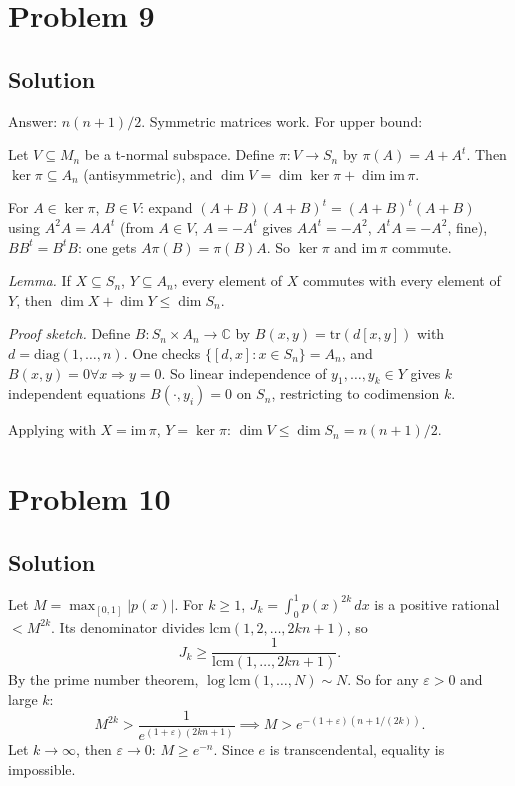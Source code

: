 \documentclass{article}
\begin{document}
\section*{Problem 9}
\subsection*{Solution}
Answer: $n(n+1)/2$. Symmetric matrices work. For upper bound:

Let $V \subseteq M_n$ be a t-normal subspace. Define $\pi: V \to S_n$ by $\pi(A) = A + A^t$. Then $\ker \pi \subseteq A_n$ (antisymmetric), and $\dim V = \dim\ker\pi + \dim\mathrm{im}\,\pi$.

For $A \in \ker\pi$, $B \in V$: expand $(A+B)(A+B)^t = (A+B)^t(A+B)$ using $A^2A = AA^t$ (from $A \in V$, $A = -A^t$ gives $AA^t = -A^2$, $A^tA = -A^2$, fine), $BB^t = B^tB$: one gets $A\pi(B) = \pi(B) A$. So $\ker\pi$ and $\mathrm{im}\,\pi$ commute.

\emph{Lemma.} If $X \subseteq S_n$, $Y \subseteq A_n$, every element of $X$ commutes with every element of $Y$, then $\dim X + \dim Y \le \dim S_n$.

\emph{Proof sketch.} Define $B: S_n \times A_n \to \mathbb{C}$ by $B(x,y) = \mathrm{tr}(d[x,y])$ with $d = \mathrm{diag}(1,\dots,n)$. One checks $\{[d,x]: x \in S_n\} = A_n$, and $B(x,y) = 0 \forall x \Rightarrow y = 0$. So linear independence of $y_1, \dots, y_k \in Y$ gives $k$ independent equations $B(\cdot, y_i) = 0$ on $S_n$, restricting to codimension $k$.

Applying with $X = \mathrm{im}\,\pi$, $Y = \ker\pi$: $\dim V \le \dim S_n = n(n+1)/2$.

\section*{Problem 10}
\subsection*{Solution}
Let $M = \max_{[0,1]} |p(x)|$. For $k \ge 1$, $J_k = \int_0^1 p(x)^{2k}\,dx$ is a positive rational $< M^{2k}$. Its denominator divides $\mathrm{lcm}(1, 2, \dots, 2kn+1)$, so
\[ J_k \ge \frac{1}{\mathrm{lcm}(1, \dots, 2kn+1)}. \]
By the prime number theorem, $\log\mathrm{lcm}(1, \dots, N) \sim N$. So for any $\varepsilon > 0$ and large $k$:
\[ M^{2k} > \frac{1}{e^{(1+\varepsilon)(2kn+1)}} \implies M > e^{-(1+\varepsilon)(n + 1/(2k))}. \]
Let $k \to \infty$, then $\varepsilon \to 0$: $M \ge e^{-n}$. Since $e$ is transcendental, equality is impossible.
\end{document}
